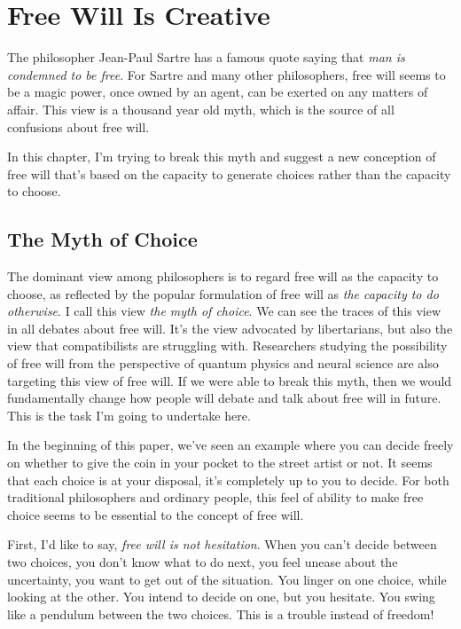 \section{Free Will Is Creative}

The philosopher Jean-Paul Sartre has a famous quote saying that \emph{man is condemned to be free}. For Sartre and many other philosophers, free will seems to be a magic power, once owned by an agent, can be exerted on any matters of affair. This view is a thousand year old myth, which is the source of all confusions about free will.

In this chapter, I'm trying to break this myth and suggest a new conception of free will that's based on the capacity to generate choices rather than the capacity to choose.


\subsection{The Myth of Choice}

The dominant view among philosophers is to regard free will as the capacity to choose, as reflected by the popular formulation of free will as \emph{the capacity to do otherwise}. I call this view \emph{the myth of choice}. We can see the traces of this view in all debates about free will. It's the view advocated by libertarians, but also the view that compatibilists are struggling with. Researchers studying the possibility of free will from the perspective of quantum physics and neural science are also targeting this view of free will. If we were able to break this myth, then we would fundamentally change how people will debate and talk about free will in future. This is the task I'm going to undertake here.

In the beginning of this paper, we've seen an example where you can decide freely on whether to give the coin in your pocket to the street artist or not. It seems that each choice is at your disposal, it's completely up to you to decide. For both traditional philosophers and ordinary people, this feel of ability to make free choice seems to be essential to the concept of free will.

First, I'd like to say, \emph{free will is not hesitation}. When you can't decide between two choices, you don't know what to do next, you feel unease about the uncertainty, you want to get out of the situation. You linger on one choice, while looking at the other. You intend to decide on one, but you hesitate. You swing like a pendulum between the two choices. This is a trouble instead of freedom!

